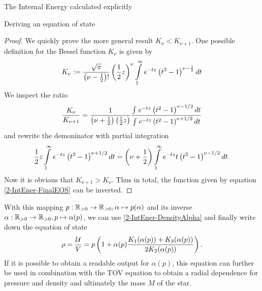 \begin{section}{The Internal Energy calculated explicitly}
\begin{subsection}{Deriving an equation of state}
\begin{proof}
	We quickly prove the more general result $K_\nu<K_{\nu+1}$. One possible definition\cite{weissteinModifiedBesselFunction} for the Bessel function $K_\nu$ is given by
	\begin{equation}
		K_\nu := \frac{\sqrt{\pi}}{\left(\nu-\frac{1}{2}\right)!}\left(\frac{1}{2}z\right)^\nu\int\limits_1^\infty\mathit{e}^{-tz}\left(t^2-1\right)^{\nu-\frac{1}{2}}dt
	\end{equation}
	We inspect the ratio
	\begin{equation}
		\frac{K_\nu}{K_{\nu+1}} = \frac{1}{\left(\nu+\frac{1}{2}\right)\left(\frac{1}{2}z\right)}\frac{\int\mathit{e}^{-tz}\left(t^2-1\right)^{\nu-1/2}dt}{\int\mathit{e}^{-tz}\left(t^2-1\right)^{\nu+1/2}dt}
	\end{equation}
	and rewrite the demoninator with partial integration
	\begin{equation}
		 \frac{1}{2}z\int\limits_1^\infty\mathit{e}^{-tz}\left(t^2-1\right)^{\nu+1/2}dt = \left(\nu+\frac{1}{2}\right)\int\limits_1^\infty \mathit{e}^{-tz}t\left(t^2-1\right)^{\nu-1/2}dt.
	\end{equation}
	Now it is obvious that $K_{\nu+1}>K_\nu$. Thus in total, the function given by equation \ref{2-IntEner-FinalEOS} can be inverted.
\end{proof}%
%
%
\noindent With this mapping $p:\mathbb{R}_{>0}\rightarrow \mathbb{R}_{>0},\alpha\mapsto p(\alpha)$ and its inverse $\alpha:\mathbb{R}_{>0}\rightarrow \mathbb{R}_{>0},p\mapsto \alpha(p)$, we can use \ref{2-IntEner-DensityAlpha} and finally write down the equation of state 
\begin{equation}
	\rho = \frac{\mathcal{U}}{V} = p\left(1+\alpha(p)\frac{K_1(\alpha(p))+K_3(\alpha(p))}{2K_2(\alpha(p))}\right).
	\label{2-IntEner-FinalEOS}
\end{equation}
If it is possible to obtain a readable output for $\alpha(p)$, this equation can further be used in combination with the TOV equation to obtain a radial dependence for pressure and density and ultimately the mass $M$ of the star.
\end{subsection}
%
%
\end{section}
